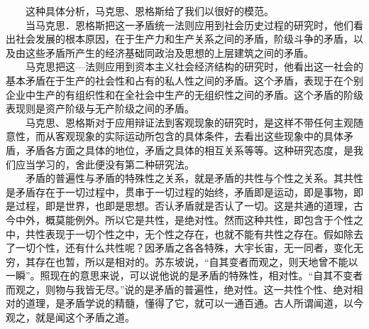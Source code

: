 \documentclass[cn,11pt,chinese]{elegantbook}
\begin{document}
　　这种具体分析，马克思、恩格斯给了我们以很好的模范。\\
　　当马克思．恩格斯把这一矛盾统一法则应用到社会历史过程的研究时，他们看出社会发展的根本原因，在于生产力和生产关系之间的矛盾，阶级斗争的矛盾，以及由这些矛盾所产生的经济基础同政治及思想的上层建筑之间的矛盾。\\
　　马克思把这—法则应用到资本主义社会经济结构的研究时，他看出这一社会的基本矛盾在于生产的社会性和占有的私人性之间的矛盾。这个矛盾，表现于在个别企业中生产的有组织性和在全社会中生产的无组织性之间的矛盾。这个矛盾的阶级表现则是资产阶级与无产阶级之间的矛盾。\\
　　马克思、恩格斯对于应用辩证法到客观现象的研究时，是这样不带任何主观随意性，而从客观现象的实际运动所包含的具体条件，去看出这些现象中的具体矛盾，矛盾各方面之具体的地位，矛盾之具体的相互关系等等。这种研究态度，是我们应当学习的，舍此便没有第二种研究法。\\
　　矛盾的普遍性与矛盾的特殊性之关系，就是矛盾的共性与个性之关系。其共性是矛盾存在于一切过程中，贯串于一切过程的始终，矛盾即是运动，即是事物，即是过程，即是世界，也即是思想。否认矛盾就是否认了一切。这是共通的道理，古今中外，概莫能例外。所以它是共性，是绝对性。然而这种共性，即包含于个性之中，共性表现于一切个性之中，无个性之存在，也就不能有共性之存在。假如除去了一切个性，还有什么共性呢？因矛盾之各各特殊，大宇长宙，无一同者，变化无穷，其存在也暂，所以是相对的。苏东坡说，“自其变者而观之，则天地曾不能以一瞬”。照现在的意思来说，可以说他说的是矛盾的特殊性，相对性。“自其不变者而观之，则物与我皆无尽。”说的是矛盾的普遍性，绝对性。这一共性个性、绝对相对的道理，是矛盾学说的精髓，懂得了它，就可以一通百通。古人所谓闻道，以今观之，就是闻这个矛盾之道。\\
\end{document}
